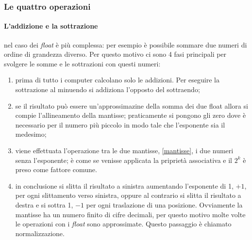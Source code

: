 \documentclass{article}
\begin{document}
\subsubsection{Le quattro operazioni}
\paragraph{L'addizione e la sottrazione} nel caso dei \textit{float} è più complessa: per esempio è possibile sommare due numeri di ordine di grandezza diverso. Per questo motivo ci sono 4 fasi principali per svolgere le somme e le sottrazioni con questi numeri:
\begin{enumerate}
	\item prima di tutto i computer calcolano solo le addizioni. Per eseguire la sottrazione al minuendo si addiziona l'opposto del sottraendo;

	\item se il risultato può essere un'approssimazine della somma dei due float allora si compie l'allineamento della mantisse; praticamente si pongono gli zero dove è necessario per il numero più piccolo in modo tale che l'esponente sia il medesimo;

	\item viene effettuata l'operazione tra le due mantisse, \autoref{mantisse}, i due numeri senza l'esponente; è come se venisse applicata la priprietà associativa e il $2^k$ è preso come fattore comune.

	\item \label{normalizzazione}in conclusione si slitta il risultato a sinistra aumentando l'esponente di 1, $+1$, per ogni slittamento verso sinistra, oppure al contrario si slitta il risultato a destra e si sottra 1, $-1$ per ogni traslazione di una posizione. Ovviamente la mantisse ha un numero finito di cifre decimali, per questo motivo molte volte le operazioni con i \textit{float} sono approssimate. Questo passaggio è chiamato normalizzazione.
\end{enumerate}
\end{document}
